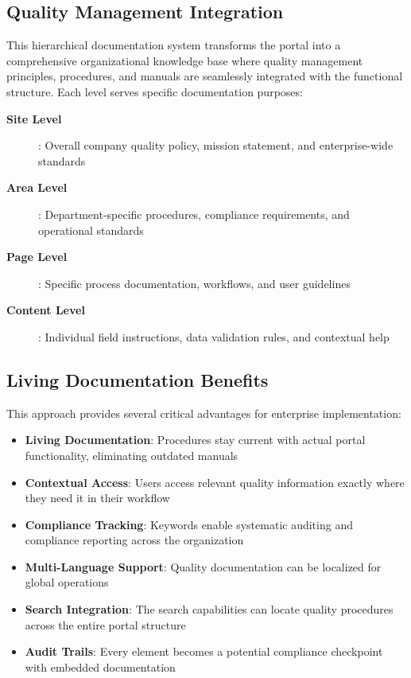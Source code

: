 \subsection{Quality Management Integration}
\label{sec:quality-management}

This hierarchical documentation system transforms the portal into a comprehensive organizational knowledge base where quality management principles, procedures, and manuals are seamlessly integrated with the functional structure. Each level serves specific documentation purposes:

\begin{description}
\item[\textbf{Site Level}]: Overall company quality policy, mission statement, and enterprise-wide standards
\item[\textbf{Area Level}]: Department-specific procedures, compliance requirements, and operational standards
\item[\textbf{Page Level}]: Specific process documentation, workflows, and user guidelines
\item[\textbf{Content Level}]: Individual field instructions, data validation rules, and contextual help
\end{description}

\subsection{Living Documentation Benefits}
\label{sec:living-documentation}

This approach provides several critical advantages for enterprise implementation:

\begin{itemize}
\item \textbf{Living Documentation}: Procedures stay current with actual portal functionality, eliminating outdated manuals
\item \textbf{Contextual Access}: Users access relevant quality information exactly where they need it in their workflow
\item \textbf{Compliance Tracking}: Keywords enable systematic auditing and compliance reporting across the organization
\item \textbf{Multi-Language Support}: Quality documentation can be localized for global operations
\item \textbf{Search Integration}: The \studio{} search capabilities can locate quality procedures across the entire portal structure
\item \textbf{Audit Trails}: Every element becomes a potential compliance checkpoint with embedded documentation
\end{itemize}

